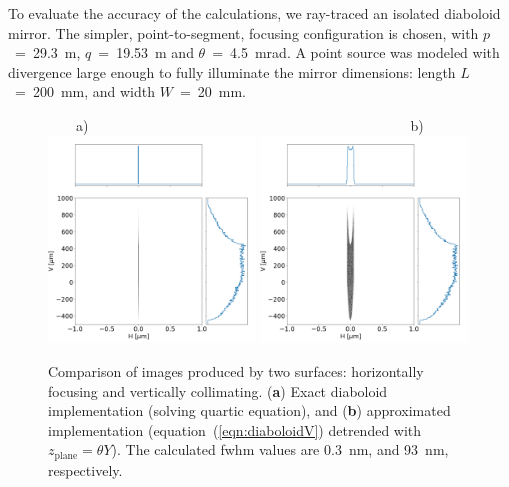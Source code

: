 \documentclass{iucr}       %
\begin{document}
To evaluate the accuracy of the calculations, we ray-traced an isolated diaboloid mirror. The simpler, point-to-segment, focusing configuration is chosen, with $p$~=~\SI{29.3}{\meter}, $q$~=~\SI{19.53}{\meter} and $\theta$~=~\SI{4.5}{\milli\radian}. A point source was modeled with divergence large enough to fully illuminate the mirror dimensions: length $L$~=~\SI{200}{\milli\meter}, and width $W$~=~\SI{20}{\milli\meter}.

\begin{figure}
\label{fig:pointToSegment}
\flushleft
~~~~a)~~~~~~~~~~~~~~~~~~~~~~~~~~~~~~~~~~~~~~~~~~~~~~b)\\
\centering
\includegraphics[width=0.49\textwidth]{figures/p2s_V_z.png}
\includegraphics[width=0.49\textwidth]{figures/p2s_K_z.png} \\
\flushleft
\caption{Comparison of images produced by two surfaces: horizontally focusing and vertically collimating. (\textbf{a}) Exact diaboloid implementation (solving quartic equation), and (\textbf{b}) approximated implementation (equation~(\ref{eqn:diaboloidV}) detrended with $z_\mathrm{plane}=\theta Y$). The calculated fwhm values are \SI{0.3}{\nano\meter}, and \SI{93}{\nano\meter}, respectively.}
\end{figure}
\end{document}
